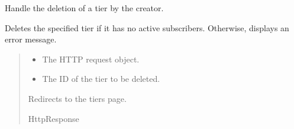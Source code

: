 \documentclass[letterpaper,10pt,english]{sphinxmanual}
\begin{document}

\begin{fulllineitems}
\label{\detokenize{modules/views:creator.views.delete_tier}}
\pysigstartsignatures
{}
\pysigstopsignatures
\sphinxAtStartPar
Handle the deletion of a tier by the creator.

\sphinxAtStartPar
Deletes the specified tier if it has no active subscribers. Otherwise,
displays an error message.
\begin{quote}\begin{description}
\begin{itemize}
\item {} 
\sphinxAtStartPar
{} \textendash{} The HTTP request object.

\item {} 
\sphinxAtStartPar
{} \textendash{} The ID of the tier to be deleted.

\end{itemize}

\sphinxAtStartPar
Redirects to the tiers page.

\sphinxAtStartPar
HttpResponse

\end{description}\end{quote}

\end{fulllineitems}

\end{document}
